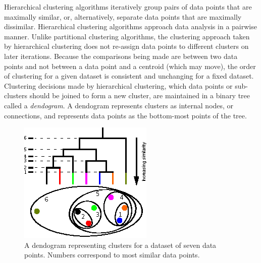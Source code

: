 \documentclass[12pt]{ucthesis}
\begin{document}
      Hierarchical clustering algorithms iteratively group pairs of data
      points that are maximally similar, or, alternatively, separate data
      points that are maximally dissimilar. Hierarchical clustering algorithms
      approach data analysis in a pairwise manner. Unlike partitional
      clustering algorithms, the clustering approach taken by hierarchical
      clustering does not re-assign data points to different clusters on later
      iterations. Because the comparisons being made are between two data
      points and not between a data point and a centroid (which may move), the
      order of clustering for a given dataset is consistent and unchanging for
      a fixed dataset. Clustering decisions made by hierarchical
      clustering, which data points or sub-clusters should be joined to form a
      new cluster, are maintained in a binary tree called a \textit{dendogram}.
      A dendogram represents clusters as internal nodes, or connections, and
      represents data points as the bottom-most points of the tree.
      
      \begin{figure}[t]
         \centering
         \includegraphics[width=0.7\columnwidth]{graphics/DendogramExample.eps}
         \caption{A dendogram representing clusters for a dataset of seven data
                  points. Numbers correspond to most similar data points.}
         \label{fig:dendogram_example}
      \end{figure}
      
\end{document}
